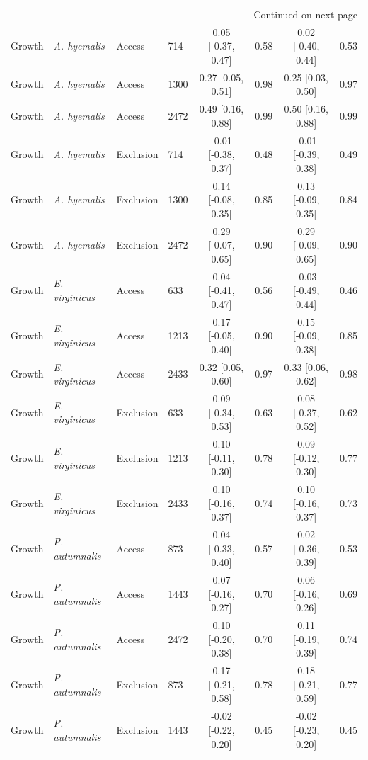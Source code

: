 \begin{landscape}
\begin{longtable}{llllcccc}
\midrule
\multicolumn{8}{r}{{Continued on next page}} \\
\endfoot

\bottomrule
\endlastfoot

  Growth & \textit{A. hyemalis} & Access & 714 & 0.05 [-0.37, 0.47] & 0.58 & 0.02 [-0.40, 0.44] & 0.53 \\
  Growth & \textit{A. hyemalis} & Access & 1300 & 0.27 [0.05, 0.51] & 0.98 & 0.25 [0.03, 0.50] & 0.97 \\
  Growth & \textit{A. hyemalis} & Access & 2472 & 0.49 [0.16, 0.88] & 0.99 & 0.50 [0.16, 0.88] & 0.99 \\
  Growth & \textit{A. hyemalis} & Exclusion & 714 & -0.01 [-0.38, 0.37] & 0.48 & -0.01 [-0.39, 0.38] & 0.49 \\
  Growth & \textit{A. hyemalis} & Exclusion & 1300 & 0.14 [-0.08, 0.35] & 0.85 & 0.13 [-0.09, 0.35] & 0.84 \\
  Growth & \textit{A. hyemalis} & Exclusion & 2472 & 0.29 [-0.07, 0.65] & 0.90 & 0.29 [-0.09, 0.65] & 0.90 \\
  Growth & \textit{E. virginicus} & Access & 633 & 0.04 [-0.41, 0.47] & 0.56 & -0.03 [-0.49, 0.44] & 0.46 \\
  Growth & \textit{E. virginicus} & Access & 1213 & 0.17 [-0.05, 0.40] & 0.90 & 0.15 [-0.09, 0.38] & 0.85 \\
  Growth & \textit{E. virginicus} & Access & 2433 & 0.32 [0.05, 0.60] & 0.97 & 0.33 [0.06, 0.62] & 0.98 \\
  Growth & \textit{E. virginicus} & Exclusion & 633 & 0.09 [-0.34, 0.53] & 0.63 & 0.08 [-0.37, 0.52] & 0.62 \\
  Growth & \textit{E. virginicus} & Exclusion & 1213 & 0.10 [-0.11, 0.30] & 0.78 & 0.09 [-0.12, 0.30] & 0.77 \\
  Growth & \textit{E. virginicus} & Exclusion & 2433 & 0.10 [-0.16, 0.37] & 0.74 & 0.10 [-0.16, 0.37] & 0.73 \\
  Growth & \textit{P. autumnalis} & Access & 873 & 0.04 [-0.33, 0.40] & 0.57 & 0.02 [-0.36, 0.39] & 0.53 \\
  Growth & \textit{P. autumnalis} & Access & 1443 & 0.07 [-0.16, 0.27] & 0.70 & 0.06 [-0.16, 0.26] & 0.69 \\
  Growth & \textit{P. autumnalis} & Access & 2472 & 0.10 [-0.20, 0.38] & 0.70 & 0.11 [-0.19, 0.39] & 0.74 \\
  Growth & \textit{P. autumnalis} & Exclusion & 873 & 0.17 [-0.21, 0.58] & 0.78 & 0.18 [-0.21, 0.59] & 0.77 \\
  Growth & \textit{P. autumnalis} & Exclusion & 1443 & -0.02 [-0.22, 0.20] & 0.45 & -0.02 [-0.23, 0.20] & 0.45 \\

\end{longtable}
\end{landscape}
